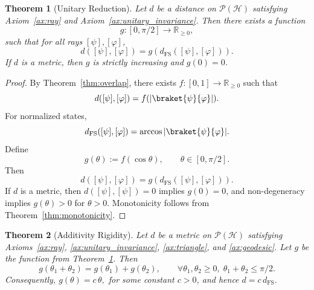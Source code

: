 \documentclass[aps,pra,reprint,nofootinbib,showpacs,superscriptaddress]{revtex4-1}
\newtheorem{theorem}{Theorem}[section]
\newcommand{\Hilbert}{\mathcal{H}}
\newcommand{\Proj}{\mathcal{P}}
\begin{document}
\begin{theorem}[Unitary Reduction]
\label{thm:unitary_reduction}
Let $d$ be a distance on $\Proj(\Hilbert)$ satisfying
Axiom~\ref{ax:ray} and Axiom~\ref{ax:unitary_invariance}.
Then there exists a function
\[
g : [0,\pi/2] \to \mathbb{R}_{\ge 0},
\]
such that for all rays $[\psi],[\varphi]$,
\[
d([\psi],[\varphi])
=
g\!\left(d_{\mathrm{FS}}([\psi],[\varphi])\right).
\]
If $d$ is a metric, then $g$ is strictly increasing and $g(0)=0$.
\end{theorem}
\begin{proof}
By Theorem~\ref{thm:overlap}, there exists
$f:[0,1]\to\mathbb{R}_{\ge 0}$ such that
\[
d([\psi],[\varphi])
=
f(|\braket{\psi}{\varphi}|).
\]
For normalized states,
\[
d_{\mathrm{FS}}([\psi],[\varphi])
=
\arccos |\braket{\psi}{\varphi}|.
\]
Define
\[
g(\theta) := f(\cos\theta),
\qquad \theta \in [0,\pi/2].
\]
Then
\[
d([\psi],[\varphi])
=
g(d_{\mathrm{FS}}([\psi],[\varphi])).
\]
If $d$ is a metric, then $d([\psi],[\psi])=0$ implies
$g(0)=0$, and non-degeneracy implies $g(\theta)>0$
for $\theta>0$. Monotonicity follows from
Theorem~\ref{thm:monotonicity}.
\end{proof}
\begin{theorem}[Additivity Rigidity]
\label{thm:additivity_rigidity}
Let $d$ be a metric on $\Proj(\Hilbert)$ satisfying
Axioms~\ref{ax:ray}, \ref{ax:unitary_invariance},
\ref{ax:triangle}, and \ref{ax:geodesic}.
Let $g$ be the function from
Theorem~\ref{thm:unitary_reduction}.
Then
\[
g(\theta_1+\theta_2)
=
g(\theta_1)+g(\theta_2),
\qquad
\forall \theta_1,\theta_2\ge 0,
\;
\theta_1+\theta_2\le\pi/2.
\]
Consequently,
\(
g(\theta)=c\,\theta, 
\)
for some constant $c>0$, and hence
\(
d = c\, d_{\mathrm{FS}}.
\)
\end{theorem}
\end{document}
